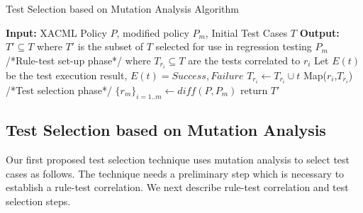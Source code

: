 

\begin{algorithmic}
\begin{algorithm}[t]
\caption{\label{alg:mutationanalysis}Test Selection based on Mutation Analysis Algorithm}
\STATE \textbf{Input:} XACML Policy $P$, modified policy $P_{m}$, Initial Test Cases $T$
\STATE \textbf{Output:} $T' \subseteq T$ where $T'$ is the subset of $T$ selected for use in regression testing $P_{m}$
\STATE /*Rule-test set-up phase*/
 where $T_{r_{i}} \subseteq T$ are the tests correlated to $r_{i}$ 
\STATE Let $E(t)$ be the test execution result, $E(t)={Success, Failure}$
\STATE $T_{r_{i}} \leftarrow T_{r_{i}} \cup t$
\ENDIF
\ENDFOR
\STATE Map($r_{i}$,$T_{r_{i}}$)
\ENDFOR
\STATE /*Test selection phase*/
\STATE $\{r_{m}\}_{i=1..m} \leftarrow diff(P,P_{m})$
\ENDFOR
\STATE return $T'$
\end{algorithm}
\end{algorithmic}

\subsection{Test Selection based on Mutation Analysis}
Our first proposed test selection technique uses mutation analysis to select test cases as follows. 
The technique needs a preliminary step which is necessary to establish a rule-test correlation.
We next describe rule-test correlation and test selection steps.

